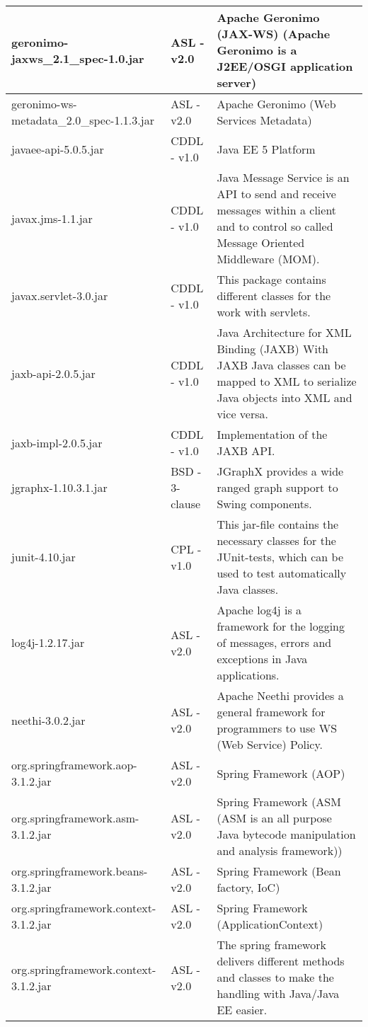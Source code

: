 \begin{center}
\begin{longtable}{|p{}|p{}|p{}|}
\hline 
geronimo-jaxws_2.1_spec-1.0.jar & ASL - v2.0 & Apache Geronimo (JAX-WS) (Apache Geronimo is a J2EE/OSGI application server)\\
\hline 
geronimo-ws-metadata_2.0_spec-1.1.3.jar & ASL - v2.0 & Apache Geronimo (Web Services Metadata)\\
\hline 
javaee-api-5.0.5.jar & CDDL - v1.0 & Java EE 5 Platform\\
\hline 
javax.jms-1.1.jar & CDDL - v1.0 & Java Message Service is an API to send and receive messages within a client and to control so called Message Oriented Middleware (MOM).\\
\hline 
javax.servlet-3.0.jar & CDDL - v1.0 & This package contains different classes for the work with servlets.\\
\hline 
jaxb-api-2.0.5.jar & CDDL - v1.0 & Java Architecture for XML Binding (JAXB) With JAXB Java classes can be mapped to XML to serialize Java objects into XML and vice versa.\\
\hline 
jaxb-impl-2.0.5.jar & CDDL - v1.0 & Implementation of the JAXB API.\\
\hline 
jgraphx-1.10.3.1.jar & BSD - 3-clause & JGraphX provides a wide ranged graph support to Swing components.\\
\hline 
junit-4.10.jar & CPL - v1.0 & This jar-file contains the necessary classes for the JUnit-tests, which can be used to test automatically Java classes.\\
\hline 
log4j-1.2.17.jar & ASL - v2.0 & Apache log4j is a framework for the logging of messages, errors and exceptions in Java applications.\\
\hline 
neethi-3.0.2.jar & ASL - v2.0 & Apache Neethi provides a general framework for programmers to use WS (Web Service) Policy.\\
\hline 
org.springframework.aop-3.1.2.jar & ASL - v2.0 & Spring Framework (AOP)\\
\hline 
org.springframework.asm-3.1.2.jar & ASL - v2.0 & Spring Framework (ASM (ASM is an all purpose Java bytecode manipulation and analysis framework))\\
\hline 
org.springframework.beans-3.1.2.jar & ASL - v2.0 & Spring Framework (Bean factory, IoC)\\
\hline 
org.springframework.context-3.1.2.jar & ASL - v2.0 & Spring Framework (ApplicationContext)\\
\hline 
org.springframework.context-3.1.2.jar & ASL - v2.0 & The spring framework delivers different methods and classes to make the handling with Java/Java EE easier.\\

\end{longtable}
\end{center}
